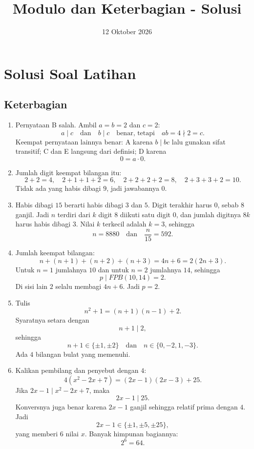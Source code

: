 \documentclass[12pt]{scrartcl}
\title{Modulo dan Keterbagian - Solusi}
\date{12 Oktober 2026}
\begin{document}
\maketitle

\renewcommand*\contentsname{Daftar Isi}
\tableofcontents

\newpage

\section{Solusi Soal Latihan}

\subsection{Keterbagian}

\begin{enumerate}
	\item Pernyataan B salah. Ambil $a = b = 2$ dan $c = 2$:
	\[ a \mid c \quad \text{dan} \quad b \mid c \quad \text{benar, tetapi} \quad ab = 4 \nmid 2 = c. \]
	Keempat pernyataan lainnya benar:
	A karena $b \mid bc$ lalu gunakan sifat transitif;
	C dan E langsung dari definisi;
	D karena
	\[ 0 = a \cdot 0. \]

	\item Jumlah digit keempat bilangan itu:
	\[ 2 + 2 = 4, \quad 2 + 1 + 1 + 2 = 6, \quad 2 + 2 + 2 + 2 = 8, \quad 2 + 3 + 3 + 2 = 10. \]
	Tidak ada yang habis dibagi $9$, jadi jawabannya $0$.

	\item Habis dibagi $15$ berarti habis dibagi $3$ dan $5$.
	Digit terakhir harus $0$, sebab $8$ ganjil.
	Jadi $n$ terdiri dari $k$ digit $8$ diikuti satu digit $0$,
	dan jumlah digitnya $8k$ harus habis dibagi $3$.
	Nilai $k$ terkecil adalah $k = 3$, sehingga
	\[ n = 8880 \quad \text{dan} \quad \frac{n}{15} = 592. \]

	\item Jumlah keempat bilangan:
	\[ n + (n+1) + (n+2) + (n+3) = 4n + 6 = 2(2n+3). \]
	Untuk $n = 1$ jumlahnya $10$ dan untuk $n = 2$ jumlahnya $14$, sehingga
	\[ p \mid FPB(10, 14) = 2. \]
	Di sisi lain $2$ selalu membagi $4n + 6$.
	Jadi $p = 2$.

	\item Tulis
	\[ n^2 + 1 = (n+1)(n-1) + 2. \]
	Syaratnya setara dengan
	\[ n + 1 \mid 2, \]
	sehingga
	\[ n + 1 \in \{\pm 1, \pm 2\} \quad \text{dan} \quad n \in \{0, -2, 1, -3\}. \]
	Ada $4$ bilangan bulat yang memenuhi.

	\item Kalikan pembilang dan penyebut dengan $4$:
	\[ 4(x^2 - 2x + 7) = (2x-1)(2x-3) + 25. \]
	Jika $2x - 1 \mid x^2 - 2x + 7$, maka
	\[ 2x - 1 \mid 25. \]
	Konversnya juga benar karena $2x - 1$ ganjil sehingga relatif prima dengan $4$.
	Jadi
	\[ 2x - 1 \in \{\pm 1, \pm 5, \pm 25\}, \]
	yang memberi $6$ nilai $x$.
	Banyak himpunan bagiannya:
	\[ 2^6 = 64. \]


\end{enumerate}
\end{document}

